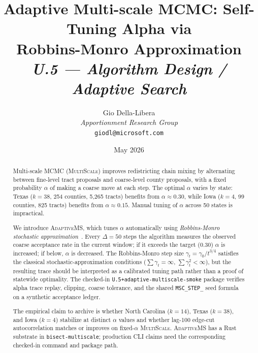 \documentclass[12pt]{article}
\title{%
  \textbf{Adaptive Multi-scale MCMC: Self-Tuning Alpha via}\\
  \textbf{Robbins-Monro Approximation}\\[0.8em]
  \normalsize\textit{U.5 --- Algorithm Design / Adaptive Search}%
}
\author{%
  Gio Della-Libera\\
  \textit{Apportionment Research Group}\\
  \small\texttt{giodl@microsoft.com}
}
\date{May 2026}
\newcommand{\ams}{\textsc{AdaptiveMS}}
\newcommand{\ms}{\textsc{MultiScale}}
\begin{document}
\maketitle

\begin{abstract}
\noindent
Multi-scale MCMC (\ms{}) improves redistricting chain mixing by alternating
between fine-level tract proposals and coarse-level county proposals, with a
fixed probability $\alpha$ of making a coarse move at each step.
The optimal $\alpha$ varies by state: Texas ($k=38$, 254 counties, 5{,}265
tracts) benefits from $\alpha \approx 0.30$, while Iowa ($k=4$, 99 counties,
825 tracts) benefits from $\alpha \approx 0.15$.
Manual tuning of $\alpha$ across 50 states is impractical.

We introduce \ams{}, which tunes $\alpha$ automatically using
\emph{Robbins-Monro stochastic approximation}~\citep{robbins1951}.
Every $\Delta = 50$ steps the algorithm measures the observed coarse acceptance
rate in the current window; if it exceeds the target (0.30) $\alpha$ is
increased; if below, $\alpha$ is decreased.
The Robbins-Monro step size $\gamma_t = \gamma_0 / t^{3/4}$ satisfies the
classical stochastic-approximation conditions
($\sum \gamma_t = \infty$, $\sum \gamma_t^2 < \infty$), but the resulting
trace should be interpreted as a calibrated tuning path rather than a proof of
statewide optimality.
The checked-in \texttt{U.5+adaptive-multiscale-smoke} package verifies alpha
trace replay, clipping, coarse tolerance, and the shared \texttt{MSC\_STEP\_}
seed formula on a synthetic acceptance ledger.

The empirical claim to archive is whether North Carolina ($k=14$), Texas
($k=38$), and Iowa ($k=4$) stabilize at distinct $\alpha$ values and whether
lag-100 edge-cut autocorrelation matches or improves on fixed-$\alpha$ \ms{}.
\ams{} has a Rust substrate in \texttt{bisect-multiscale}; production CLI claims
need the corresponding checked-in command and package path.
\end{abstract}

\tableofcontents
\newpage











\end{document}
